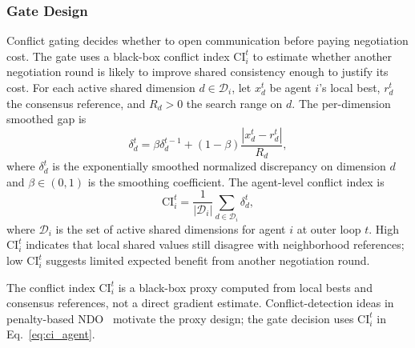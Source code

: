 \documentclass[conference]{IEEEtran}
\begin{document}
\subsubsection{Gate Design}
Conflict gating decides whether to open communication before paying negotiation cost. The gate uses a black-box conflict index $\mathrm{CI}_i^t$ to estimate whether another negotiation round is likely to improve shared consistency enough to justify its cost. For each active shared dimension $d\in\mathcal{D}_i$, let $x_d^t$ be agent $i$'s local best, $r_d^t$ the consensus reference, and $R_d>0$ the search range on $d$. The per-dimension smoothed gap is
\begin{equation}
\delta_d^t = \beta \delta_d^{t-1} + (1-\beta)\frac{|x_d^t-r_d^t|}{R_d},
\label{eq:ci_dim}
\end{equation}
where $\delta_d^t$ is the exponentially smoothed normalized discrepancy on dimension $d$ and $\beta \in (0,1)$ is the smoothing coefficient. The agent-level conflict index is
\begin{equation}
\mathrm{CI}_i^t=\frac{1}{|\mathcal{D}_i|}\sum_{d\in\mathcal{D}_i} \delta_d^t,
\label{eq:ci_agent}
\end{equation}
where $\mathcal{D}_i$ is the set of active shared dimensions for agent $i$ at outer loop $t$. High $\mathrm{CI}_i^t$ indicates that local shared values still disagree with neighborhood references; low $\mathrm{CI}_i^t$ suggests limited expected benefit from another negotiation round.

The conflict index $\mathrm{CI}_i^t$ is a black-box proxy computed from local bests and consensus references, not a direct gradient estimate. Conflict-detection ideas in penalty-based NDO~\cite{ref_macpo} motivate the proxy design; the gate decision uses $\mathrm{CI}_i^t$ in Eq.~\eqref{eq:ci_agent}.
\end{document}
